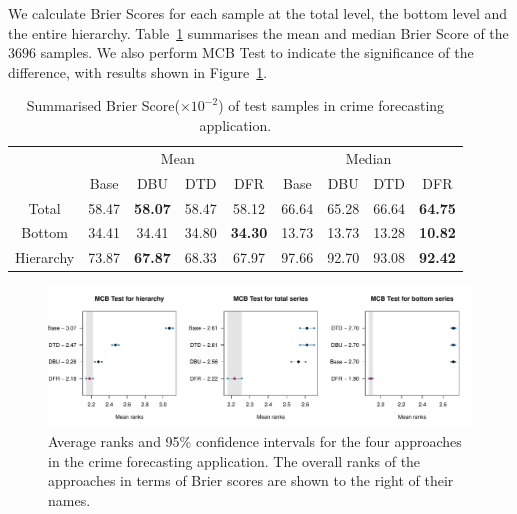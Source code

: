 \documentclass[a4paper,review,12pt,authoryear]{elsarticle}
\theoremstyle{definition}
\begin{document}
     We calculate Brier Scores for each sample at the total level, the bottom level and the entire hierarchy.
     Table~\ref{tab:crime_bs} summarises the mean and median Brier Score of the $3696$ samples.
     We also perform MCB Test to indicate the significance of the difference, with results shown in Figure~\ref{fig:application_crime}.

     \begin{table}[h]
       \centering
       \caption{\label{tab:crime_bs}Summarised Brier Score($\times 10^{-2}$) of test samples in crime forecasting application.}
       \begin{tabular}{ccccccccc}
       \toprule
       &\multicolumn{4}{c}{Mean}
       & \multicolumn{4}{c}{Median} \\ \cmidrule(lr){2-5} \cmidrule(lr){6-9}
        & Base & DBU & DTD & DFR &  Base & DBU & DTD & DFR \\\midrule
       Total & 58.47 & \textbf{58.07} & 58.47 & 58.12 & 66.64 & 65.28 & 66.64 & \textbf{64.75} \\
       Bottom & 34.41 & 34.41 & 34.80 & \textbf{34.30} & 13.73 & 13.73 & 13.28 & \textbf{10.82}\\
       Hierarchy & 73.87 & \textbf{67.87} & 68.33 & 67.97 & 97.66 & 92.70 & 93.08 & \textbf{92.42}\\
       \bottomrule
       \end{tabular}
       \end{table}

     \begin{figure}[h]
       \caption{\label{fig:application_crime}Average ranks and 95\% confidence intervals for the four approaches in the crime forecasting application. The overall ranks of the approaches in terms of Brier scores are shown to the right of their names.}
       \centering
       \includegraphics[width=\textwidth]{figures/dc_crime_mcb.pdf}
     \end{figure}
\end{document}
